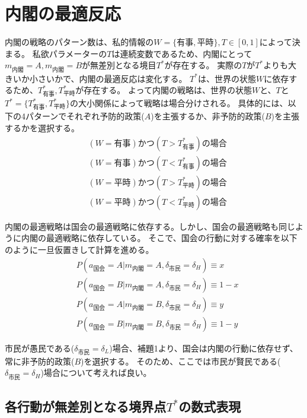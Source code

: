 \documentclass[main.tex]{subfiles}
\begin{document}
\section{内閣の最適反応}



内閣の戦略のパターン数は、私的情報の$W=\lbrace 有事, 平時\rbrace, T\in[0,1]$によって決まる。
私欲パラメーターの$T$は連続変数であるため、内閣にとって$m_{内閣}=A,m_{内閣}=B$が無差別となる境目$T^*$が存在する。
実際の$T$が$T^*$よりも大きいか小さいかで、内閣の最適反応は変化する。
$T^*$は、世界の状態$W$に依存するため、$T^*_{有事}, T^*_{平時}$が存在する。
よって内閣の戦略は、世界の状態$W$と、$T$と$T^* = \lbrace T^*_{有事}, T^*_{平時} \rbrace$の大小関係によって戦略は場合分けされる。
具体的には、以下の4パターンでそれぞれ予防的政策($A$)を主張するか、非予防的政策($B$)を主張するかを選択する。
\begin{align*}
    & (W=有事) かつ (T > T^*_{有事}) の場合 \\
    & (W=有事) かつ (T < T^*_{有事}) の場合 \\
    & (W=平時) かつ (T > T^*_{平時}) の場合 \\
    & (W=平時) かつ (T < T^*_{平時}) の場合 
\end{align*}


内閣の最適戦略は国会の最適戦略に依存する。しかし、国会の最適戦略も同じように内閣の最適戦略に依存している。
そこで、国会の行動に対する確率を以下のように一旦仮置きして計算を進める。
\begin{align*}
    & P(a_{国会} = A| m_{内閣} = A, \delta_{市民} = \delta_H ) \equiv x \\
    & P(a_{国会} = B| m_{内閣} = A, \delta_{市民} = \delta_H ) \equiv 1-x \\
    & P(a_{国会} = A| m_{内閣} = B, \delta_{市民} = \delta_H ) \equiv y \\
    & P(a_{国会} = B| m_{内閣} = B, \delta_{市民} = \delta_H ) \equiv 1-y
\end{align*}

市民が愚民である($\delta_{市民}=\delta_L$)場合、補題1より、国会は内閣の行動に依存せず、常に非予防的政策($B$)を選択する。
そのため、ここでは市民が賢民である($\delta_{市民}=\delta_H$)場合について考えれば良い。




\subsection{各行動が無差別となる境界点$T^*$の数式表現}
\end{document}

